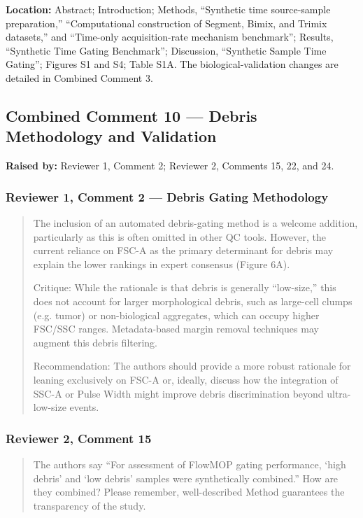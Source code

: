 \documentclass[
  11pt,
  a4paper,
]{article}
\begin{document}
\textbf{Location:} Abstract; Introduction; Methods, ``Synthetic time
source-sample preparation,'' ``Computational construction of Segment,
Bimix, and Trimix datasets,'' and ``Time-only acquisition-rate mechanism
benchmark''; Results, ``Synthetic Time Gating Benchmark''; Discussion,
``Synthetic Sample Time Gating''; Figures S1 and S4; Table S1A. The
biological-validation changes are detailed in Combined Comment 3.

\subsection{Combined Comment 10 --- Debris Methodology and
Validation}\label{combined-comment-10--debris-methodology-and-validation}

\textbf{Raised by:} Reviewer 1, Comment 2; Reviewer 2, Comments 15, 22,
and 24.

\subsubsection{Reviewer 1, Comment 2 --- Debris Gating
Methodology}\label{reviewer-1-comment-2--debris-gating-methodology}

\begin{quote}
The inclusion of an automated debris-gating method is a welcome
addition, particularly as this is often omitted in other QC tools.
However, the current reliance on FSC-A as the primary determinant for
debris may explain the lower rankings in expert consensus (Figure 6A).

Critique: While the rationale is that debris is generally ``low-size,''
this does not account for larger morphological debris, such as
large-cell clumps (e.g. tumor) or non-biological aggregates, which can
occupy higher FSC/SSC ranges. Metadata-based margin removal techniques
may augment this debris filtering.

Recommendation: The authors should provide a more robust rationale for
leaning exclusively on FSC-A or, ideally, discuss how the integration of
SSC-A or Pulse Width might improve debris discrimination beyond
ultra-low-size events.
\end{quote}

\subsubsection{Reviewer 2, Comment 15}\label{reviewer-2-comment-15}

\begin{quote}
The authors say ``For assessment of FlowMOP gating performance, `high
debris' and `low debris' samples were synthetically combined.'' How are
they combined? Please remember, well-described Method guarantees the
transparency of the study.
\end{quote}
\end{document}

